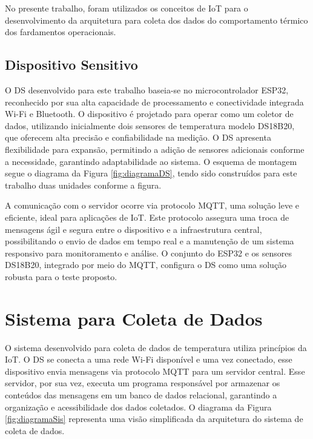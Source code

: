 	  No presente trabalho, foram utilizados os conceitos de \acrlong{IoT} para o desenvolvimento da arquitetura para coleta dos dados do comportamento térmico
	   dos fardamentos operacionais.

\subsection{Dispositivo Sensitivo}

	O \acrfull{DS} desenvolvido para este trabalho baseia-se no microcontrolador ESP32, reconhecido por sua alta capacidade de processamento e conectividade
	 integrada Wi-Fi e Bluetooth. O dispositivo é projetado para operar como um coletor de dados, utilizando inicialmente dois sensores de temperatura modelo DS18B20,
	  que oferecem alta precisão e confiabilidade na medição. O \acrshort{DS} apresenta flexibilidade para expansão, permitindo a adição de sensores adicionais conforme a
	   necessidade, garantindo adaptabilidade ao sistema. O esquema de montagem segue o diagrama da Figura \ref{fig:diagramaDS}, tendo sido construídos para
	    este trabalho duas unidades conforme a figura.


\begin{centering}
\end{centering}

	\tab A comunicação com o servidor ocorre via protocolo \acrfull{MQTT}, uma solução leve e eficiente, ideal para aplicações de
	 \acrlong{IoT}. Este protocolo assegura uma troca de mensagens ágil e segura entre o dispositivo e a infraestrutura central, 
	 possibilitando o envio de dados em tempo real e a manutenção de um sistema responsivo para monitoramento e análise. O conjunto do ESP32 e
	  os sensores DS18B20, integrado por meio do \acrshort{MQTT}, configura o \acrshort{DS} como uma solução robusta para o teste proposto.
	
\section{Sistema para Coleta de Dados}

	O sistema desenvolvido para coleta de dados de temperatura utiliza princípios da \acrlong{IoT}. 
	O \acrlong{DS} se conecta a uma rede Wi-Fi disponível e uma vez conectado, esse dispositivo envia 
	mensagens via protocolo \acrshort{MQTT} para um servidor central. Esse servidor, por sua vez, executa um programa responsável por armazenar os conteúdos das mensagens em um banco de dados relacional, garantindo a organização e acessibilidade dos dados coletados. O diagrama da Figura \ref{fig:diagramaSis} representa uma visão simplificada da arquitetura do sistema de coleta de dados.

